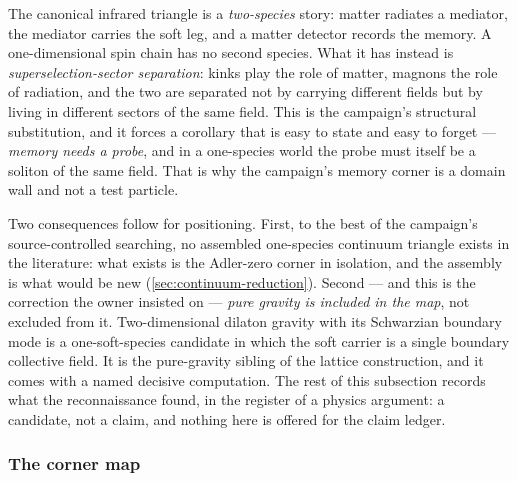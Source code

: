 The canonical infrared triangle is a \emph{two-species} story: matter radiates
a mediator, the mediator carries the soft leg, and a matter detector records the
memory. A one-dimensional spin chain has no second species. What it has instead
is \emph{superselection-sector separation}: kinks play the role of matter,
magnons the role of radiation, and the two are separated not by carrying
different fields but by living in different sectors of the same field. This is
the campaign's structural substitution, and it forces a corollary that is easy
to state and easy to forget --- \emph{memory needs a probe}, and in a
one-species world the probe must itself be a soliton of the same field. That is
why the campaign's memory corner is a domain wall and not a test particle.

Two consequences follow for positioning. First, to the best of the campaign's
source-controlled searching, no assembled one-species continuum triangle exists
in the literature: what exists is the Adler-zero corner in isolation, and the
assembly is what would be new (\cref{sec:continuum-reduction}). Second --- and
this is the correction the owner insisted on --- \emph{pure gravity is included
in the map}, not excluded from it. Two-dimensional dilaton gravity with its
Schwarzian boundary mode is a one-soft-species candidate in which the soft
carrier is a single boundary collective field. It is the pure-gravity sibling of
the lattice construction, and it comes with a named decisive computation. The
rest of this subsection records what the reconnaissance found, in the register
of a physics argument: a candidate, not a claim, and nothing here is offered
for the claim ledger.

\subsubsection*{The corner map}

